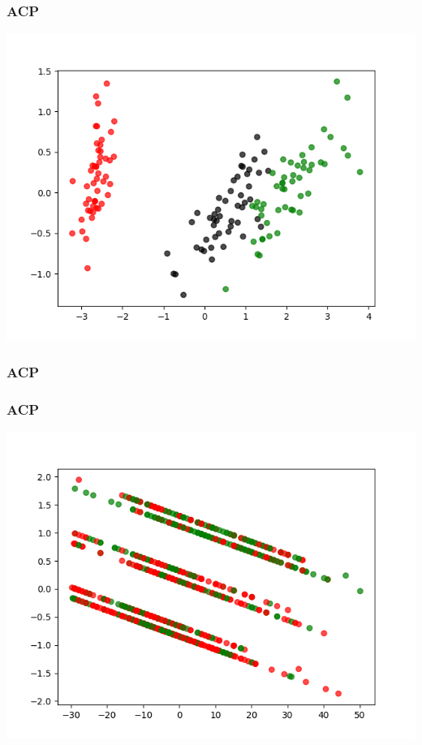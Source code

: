 \documentclass[11pt]{beamer}
\newenvironment{slide}[1]{%
\begin{frame}[environment=slide]
\frametitle{#1}
}{%
\end{frame}
}
\newcommand{\Python}[1]{
	{\small	}
}
\begin{document}
\begin{slide}{ACP}
\begin{center}
\includegraphics[scale=0.4]{iris_acp}
\end{center}
\end{slide}

\begin{slide}{ACP}
\begin{center}
\Python{acp}
\end{center}
\end{slide}

\begin{slide}{ACP}
\begin{center}
\includegraphics[scale=0.4]{titanic_acp}
\end{center}
\end{slide}
\end{document}
